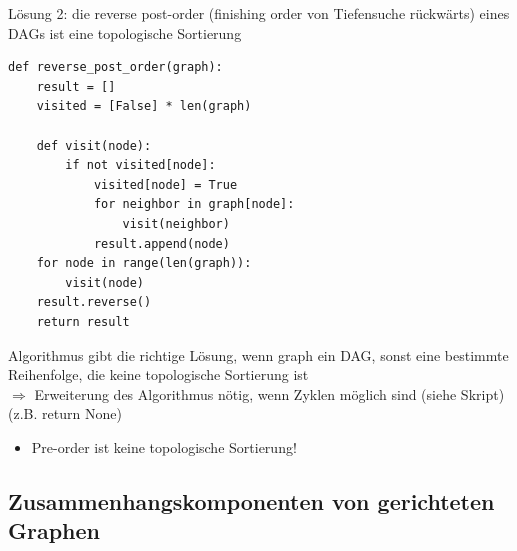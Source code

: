     Lösung 2: die reverse post-order (finishing order von Tiefensuche rückwärts) eines DAGs ist eine topologische Sortierung

    \begin{verbatim}
def reverse_post_order(graph):
    result = []
    visited = [False] * len(graph)

    def visit(node):
        if not visited[node]:
            visited[node] = True
            for neighbor in graph[node]:
                visit(neighbor)
            result.append(node)
    for node in range(len(graph)):
        visit(node)
    result.reverse()
    return result
    \end{verbatim}

    Algorithmus gibt die richtige Lösung, wenn graph ein DAG, sonst eine bestimmte Reihenfolge, die keine topologische Sortierung ist\\
    $\Rightarrow$ Erweiterung des Algorithmus nötig, wenn Zyklen möglich sind (siehe Skript) (z.B. return None)
    \begin{itemize}
        \item Pre-order ist keine topologische Sortierung!
    \end{itemize}

    \subsection*{Zusammenhangskomponenten von gerichteten Graphen}

